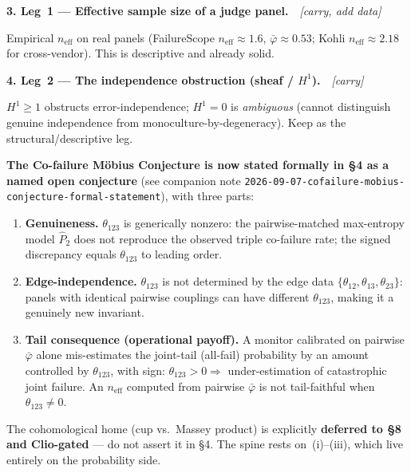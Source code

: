 \documentclass[11pt,a4paper]{article}
\begin{document}
\medskip
\noindent\textbf{3. Leg~1 --- Effective sample size of a judge panel.}\ \ \textit{[carry, add data]}

Empirical $n_{\text{eff}}$ on real panels (FailureScope $n_{\text{eff}}{\approx}1.6$, $\bar\varphi{\approx}0.53$; Kohli $n_{\text{eff}}{\approx}2.18$ for cross-vendor). This is descriptive and already solid.

\medskip
\noindent\textbf{4. Leg~2 --- The independence obstruction (sheaf / $H^1$).}\ \ \textit{[carry]}

$H^1 \ge 1$ obstructs error-independence; $H^1 = 0$ is \emph{ambiguous} (cannot distinguish genuine independence from monoculture-by-degeneracy). Keep as the structural/descriptive leg.

\smallskip
\noindent\textbf{The Co-failure M\"{o}bius Conjecture is now stated formally in \S4 as a named open conjecture}
(see companion note \texttt{2026-09-07-cofailure-mobius-conjecture-formal-statement}),
with three parts:

\begin{enumerate}[label=\textbf{(\roman*)}]
  \item \textbf{Genuineness.}
    $\theta_{123}$ is generically nonzero: the pairwise-matched max-entropy
    model $\hat{P}_2$ does not reproduce the observed triple co-failure rate;
    the signed discrepancy equals $\theta_{123}$ to leading order.

  \item \textbf{Edge-independence.}
    $\theta_{123}$ is not determined by the edge data
    $\{\theta_{12}, \theta_{13}, \theta_{23}\}$: panels with identical
    pairwise couplings can have different $\theta_{123}$, making it a
    genuinely new invariant.

  \item \textbf{Tail consequence (operational payoff).}
    A monitor calibrated on pairwise $\bar\varphi$ alone mis-estimates the
    joint-tail (all-fail) probability by an amount controlled by $\theta_{123}$,
    with sign: $\theta_{123} > 0 \Rightarrow$ under-estimation of catastrophic
    joint failure.  An $n_{\mathrm{eff}}$ computed from pairwise $\bar\varphi$
    is not tail-faithful when $\theta_{123} \ne 0$.
\end{enumerate}

\noindent The cohomological home (cup vs.\ Massey product) is explicitly
\textbf{deferred to \S8 and Clio-gated} --- do not assert it in \S4.
The spine rests on~(i)--(iii), which live entirely on the probability side.
\end{document}
